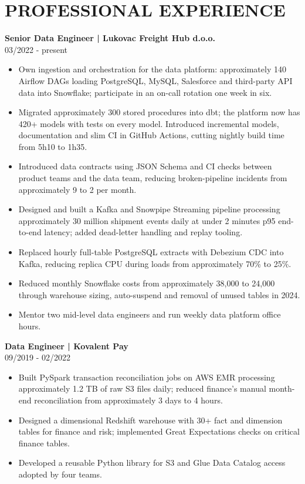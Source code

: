 \documentclass[11pt,a4paper]{article}
\newcommand{\cvsection}[1]{\section*{#1}}
\newcommand{\cvrole}[2]{\noindent\textbf{#1}\\#2\par}
\begin{document}
\cvsection{PROFESSIONAL EXPERIENCE}
\cvrole{Senior Data Engineer | Lukovac Freight Hub d.o.o.}{03/2022 - present}
\begin{itemize}
\item Own ingestion and orchestration for the data platform: approximately 140 Airflow DAGs loading PostgreSQL, MySQL, Salesforce and third-party API data into Snowflake; participate in an on-call rotation one week in six.
\item Migrated approximately 300 stored procedures into dbt; the platform now has 420+ models with tests on every model. Introduced incremental models, documentation and slim CI in GitHub Actions, cutting nightly build time from 5h10 to 1h35.
\item Introduced data contracts using JSON Schema and CI checks between product teams and the data team, reducing broken-pipeline incidents from approximately 9 to 2 per month.
\item Designed and built a Kafka and Snowpipe Streaming pipeline processing approximately 30 million shipment events daily at under 2 minutes p95 end-to-end latency; added dead-letter handling and replay tooling.
\item Replaced hourly full-table PostgreSQL extracts with Debezium CDC into Kafka, reducing replica CPU during loads from approximately 70\% to 25\%.
\item Reduced monthly Snowflake costs from approximately 38,000 to 24,000 through warehouse sizing, auto-suspend and removal of unused tables in 2024.
\item Mentor two mid-level data engineers and run weekly data platform office hours.
\end{itemize}

\newpage
\cvrole{Data Engineer | Kovalent Pay}{09/2019 - 02/2022}
\begin{itemize}
\item Built PySpark transaction reconciliation jobs on AWS EMR processing approximately 1.2 TB of raw S3 files daily; reduced finance's manual month-end reconciliation from approximately 3 days to 4 hours.
\item Designed a dimensional Redshift warehouse with 30+ fact and dimension tables for finance and risk; implemented Great Expectations checks on critical finance tables.
\item Developed a reusable Python library for S3 and Glue Data Catalog access adopted by four teams.
\end{itemize}
\end{document}
